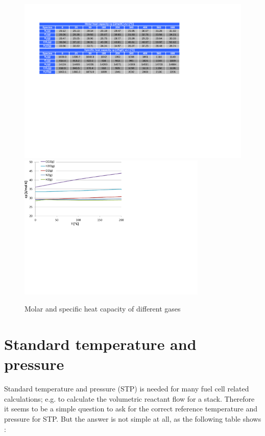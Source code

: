 \documentclass[11pt,a4paper,english,twoside]{scrreprt}
\begin{document}
\begin{figure}
  \centering
  \includegraphics*[width=\textwidth,angle=0]{FCF_Table_cp_gases.pdf}
  \vspace{1em}
  \includegraphics*[width=0.8\textwidth,angle=0]{FCF_Chart_cp.pdf}
  \caption[Molar and specific heat capacity of different gases]{Molar and specific heat capacity of different gases}
  \label{tab:cp}
\end{figure}


\section{Standard temperature and pressure}
\label{sec:STP}

Standard temperature and pressure (STP) is needed for many fuel cell related calculations; e.g. to calculate the volumetric reactant flow for a stack. Therefore it seems to be a simple question to ask for the correct reference temperature and pressure for STP. But the answer is not simple at all, as the following table shows \cite{Wiki_STP}:
\end{document}
